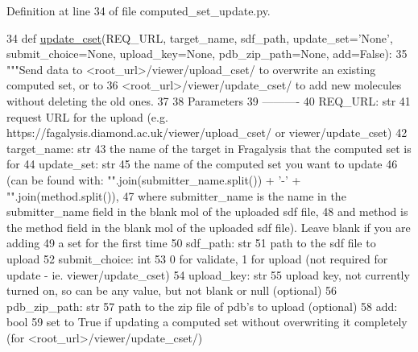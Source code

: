 Definition at line 34 of file computed\+\_\+set\+\_\+update.\+py.


\begin{DoxyCode}
34 \textcolor{keyword}{def }\hyperlink{namespacefragalysis__api_1_1xcextracter_1_1computed__set__update_a3fd757f4575c325be0c0288fa1f0738d}{update\_cset}(REQ\_URL, target\_name, sdf\_path, update\_set='None', submit\_choice=None, 
      upload\_key=None, pdb\_zip\_path=None, add=False):
35     \textcolor{stringliteral}{"""Send data to <root\_url>/viewer/upload\_cset/ to overwrite an existing computed set, or to }
36 \textcolor{stringliteral}{    <root\_url>/viewer/update\_cset/ to add new molecules without deleting the old ones.}
37 \textcolor{stringliteral}{}
38 \textcolor{stringliteral}{    Parameters}
39 \textcolor{stringliteral}{    ----------}
40 \textcolor{stringliteral}{    REQ\_URL: str}
41 \textcolor{stringliteral}{        request URL for the upload (e.g. https://fagalysis.diamond.ac.uk/viewer/upload\_cset/ or
       viewer/update\_cset)}
42 \textcolor{stringliteral}{    target\_name: str}
43 \textcolor{stringliteral}{        the name of the target in Fragalysis that the computed set is for}
44 \textcolor{stringliteral}{    update\_set: str}
45 \textcolor{stringliteral}{        the name of the computed set you want to update }
46 \textcolor{stringliteral}{        (can be found with: "".join(submitter\_name.split()) + '-' + "".join(method.split()),}
47 \textcolor{stringliteral}{        where submitter\_name is the name in the submitter\_name field in the blank mol of the uploaded sdf
       file,}
48 \textcolor{stringliteral}{        and method is the method field in the blank mol of the uploaded sdf file). Leave blank if you are
       adding}
49 \textcolor{stringliteral}{        a set for the first time}
50 \textcolor{stringliteral}{    sdf\_path: str}
51 \textcolor{stringliteral}{        path to the sdf file to upload}
52 \textcolor{stringliteral}{    submit\_choice: int}
53 \textcolor{stringliteral}{        0 for validate, 1 for upload (not required for update - ie. viewer/update\_cset)}
54 \textcolor{stringliteral}{    upload\_key: str}
55 \textcolor{stringliteral}{        upload key, not currently turned on, so can be any value, but not blank or null (optional)}
56 \textcolor{stringliteral}{    pdb\_zip\_path: str}
57 \textcolor{stringliteral}{        path to the zip file of pdb's to upload (optional)}
58 \textcolor{stringliteral}{    add: bool}
59 \textcolor{stringliteral}{        set to True if updating a computed set without overwriting it completely (for
       <root\_url>/viewer/update\_cset/)}

\end{DoxyCode}
